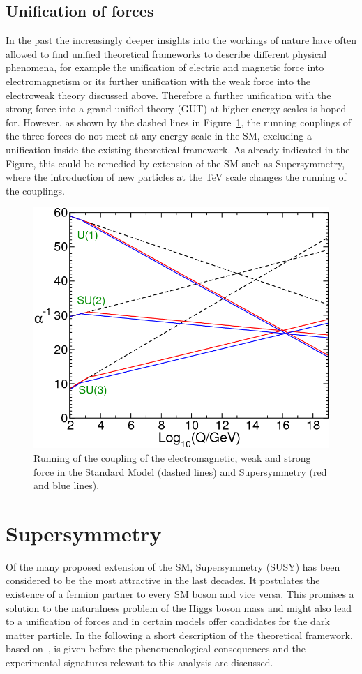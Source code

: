 \subsection*{Unification of forces}
In the past the increasingly deeper insights into the workings of nature have often allowed to find unified theoretical frameworks to describe different physical phenomena, for example the unification of electric and magnetic force into electromagnetism or its further unification with the weak force into the electroweak theory discussed above. Therefore a further unification with the strong force into a grand unified theory (GUT) at higher energy scales is hoped for. However, as shown by the dashed lines in Figure~\ref{fit:unification}, the running couplings of the three forces do not meet at any energy scale in the SM, excluding a unification inside the existing theoretical framework. As already indicated in the Figure, this could be remedied by extension of the SM such as Supersymmetry, where the introduction of new particles at the TeV scale changes the running of the couplings.
\begin{figure}
\centering
\includegraphics[scale=0.35]{plots/THEO/unification.png}
\caption{Running of the coupling of the electromagnetic, weak and strong force in the Standard Model (dashed lines) and Supersymmetry (red and blue lines).}
\label{fit:unification}
\end{figure}
\section{Supersymmetry}
Of the many proposed extension of the SM, Supersymmetry (SUSY) has been considered to be the most attractive in the last decades. It postulates the existence of a fermion partner to every SM boson and vice versa. This promises a solution to the naturalness problem of the Higgs boson mass and might also lead to a unification of forces and in certain models offer candidates for the dark matter particle. In the following a short description of the theoretical framework, based on~\cite{Martin:1997ns}, is given before the phenomenological consequences and the experimental signatures relevant to this analysis are discussed.
